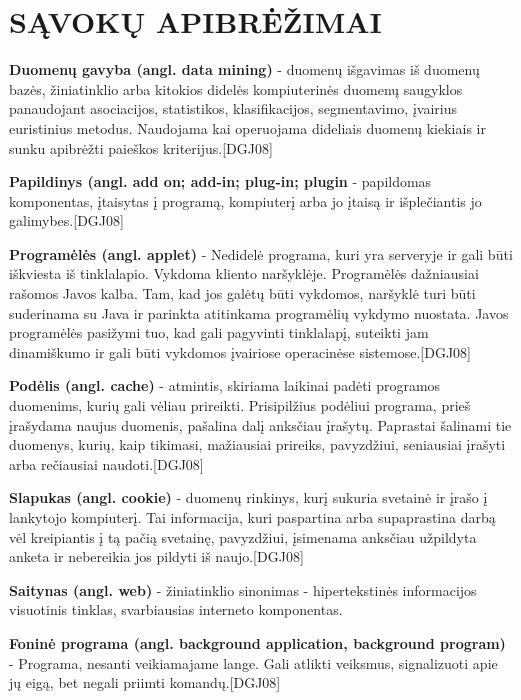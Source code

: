 \documentclass[12pt,a4paper,titlepage]{article}
\begin{document}
\section*{SĄVOKŲ APIBRĖŽIMAI}

\textbf{Duomenų gavyba (angl. data mining)} - duomenų išgavimas iš duomenų bazės, žiniatinklio arba kitokios didelės kompiuterinės duomenų saugyklos panaudojant asociacijos, statistikos, klasifikacijos, segmentavimo, įvairius euristinius metodus. Naudojama kai operuojama dideliais duomenų kiekiais ir sunku apibrėžti paieškos kriterijus.[DGJ08]

\textbf{Papildinys (angl. add on; add-in; plug-in; plugin} - papildomas komponentas, įtaisytas į programą, kompiuterį arba jo įtaisą ir išplečiantis jo galimybes.[DGJ08]

\textbf{Programėlės (angl. applet)} - Nedidelė programa, kuri yra serveryje ir
gali būti iškviesta iš tinklalapio. Vykdoma kliento naršyklėje. Programėlės
dažniausiai rašomos Javos kalba. Tam, kad jos galėtų būti vykdomos, naršyklė
turi būti suderinama su Java ir parinkta atitinkama programėlių vykdymo
nuostata. Javos programėlės pasižymi tuo, kad gali pagyvinti tinklalapį,
suteikti jam dinamiškumo ir gali būti vykdomos įvairiose operacinėse
sistemose.[DGJ08]

\textbf{Podėlis (angl. cache)} - atmintis, skiriama laikinai padėti programos
duomenims, kurių gali vėliau prireikti. Prisipilžius podėliui programa, prieš
įrašydama naujus duomenis, pašalina dalį anksčiau įrašytų. Paprastai šalinami
tie duomenys, kurių, kaip tikimasi, mažiausiai prireiks, pavyzdžiui, seniausiai
įrašyti arba rečiausiai naudoti.[DGJ08]

\textbf{Slapukas (angl. cookie)} - duomenų rinkinys, kurį sukuria svetainė ir įrašo į lankytojo kompiuterį. Tai informacija, kuri paspartina arba supaprastina darbą vėl kreipiantis į tą pačią svetainę, pavyzdžiui, įsimenama anksčiau užpildyta anketa ir nebereikia jos pildyti iš naujo.[DGJ08]

\textbf{Saitynas (angl. web)} - žiniatinklio sinonimas - hipertekstinės informacijos visuotinis tinklas, svarbiausias interneto komponentas.

\textbf{Foninė programa (angl. background application, background program)} - Programa, nesanti veikiamajame lange.
Gali atlikti veiksmus, signalizuoti apie jų eigą, bet negali priimti komandų.[DGJ08]
\end{document}
